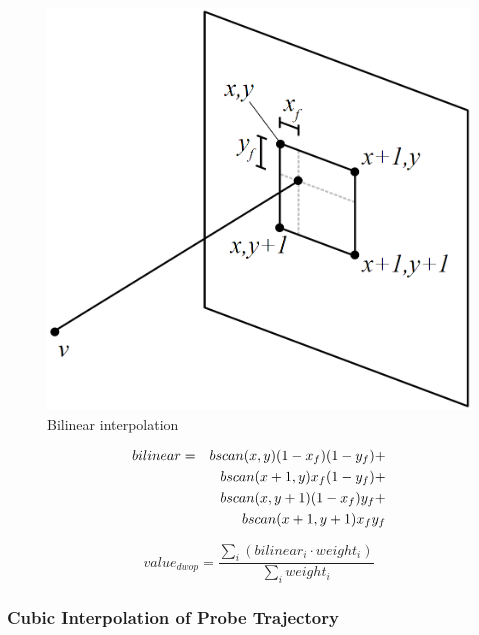 	\begin{figure}[h]
	\centering
	\includegraphics[height=0.35\textheight]{graphics/bilinear.png}
	\caption{Bilinear interpolation}
	\label{fig:bilinear}
	\end{figure}
	
	\begin{eqnarray}
		bilinear 	& = & b\-scan(x,y)(1-x_f)(1-y_f) + \nonumber \\
					&	& b\-scan(x+1,y) x_f (1-y_f) + \nonumber \\
					&	& b\-scan(x,y+1)(1-x_f) y_f + \nonumber \\
					&	& b\-scan(x+1,y+1) x_f y_f
		\label{eq:bilinear_eq}
	\end{eqnarray}
	
	\begin{equation}
		\label{eq:weighting}
		value_{dwop} = \frac{\sum_i (bilinear_i \cdot weight_i)}{\sum_i weight_i}
	\end{equation}
	
\subsubsection{Cubic Interpolation of Probe Trajectory}

	
